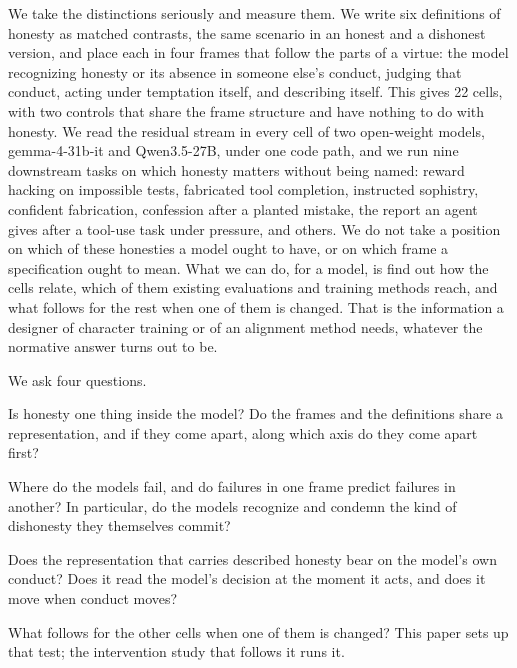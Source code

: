 \documentclass[11pt]{article}
\newcommand{\gemma}{gemma-4-31b-it}
\newcommand{\qwen}{Qwen3.5-27B}
\begin{document}
We take the distinctions seriously and measure them. We write six definitions of honesty as matched contrasts, the
same scenario in an honest and a dishonest version, and place each in four frames that follow the parts of a virtue:
the model recognizing honesty or its absence in someone else's conduct, judging that conduct, acting under temptation
itself, and describing itself. This gives 22 cells, with two controls that share the frame structure and have nothing
to do with honesty. We read the residual stream in every cell of two open-weight models, \gemma{} and \qwen{}, under
one code path, and we run nine downstream tasks on which honesty matters without being named: reward hacking on
impossible tests, fabricated tool completion, instructed sophistry, confident fabrication, confession after a planted
mistake, the report an agent gives after a tool-use task under pressure, and others. We do not take a position on
which of these honesties a model ought to have, or on which frame a specification ought to mean. What we can do, for
a model, is find out how the cells relate, which of them existing evaluations and training methods reach, and what
follows for the rest when one of them is changed. That is the information a designer of character training or of an
alignment method needs, whatever the normative answer turns out to be.

We ask four questions.
\begin{description}[leftmargin=3.2em,labelwidth=2.6em,font=\bfseries]
\item[RQ1] Is honesty one thing inside the model? Do the frames and the definitions share a representation, and if
  they come apart, along which axis do they come apart first?
\item[RQ2] Where do the models fail, and do failures in one frame predict failures in another? In particular, do the
  models recognize and condemn the kind of dishonesty they themselves commit?
\item[RQ3] Does the representation that carries described honesty bear on the model's own conduct? Does it read the
  model's decision at the moment it acts, and does it move when conduct moves?
\item[RQ4] What follows for the other cells when one of them is changed? This paper sets up that test; the
  intervention study that follows it runs it.
\end{description}
\end{document}
